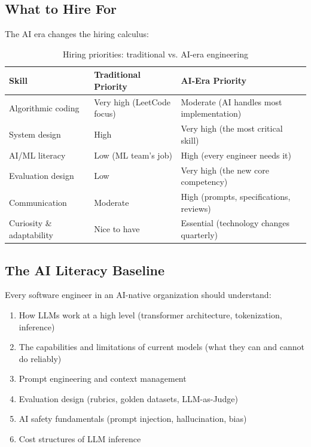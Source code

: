 \subsection{What to Hire For}

The AI era changes the hiring calculus:

\begin{table}[htbp]
\centering
\caption{Hiring priorities: traditional vs. AI-era engineering}
\label{tab:hiring}
\begin{tabularx}{\textwidth}{lXX}
\toprule
\textbf{Skill} & \textbf{Traditional Priority} & \textbf{AI-Era Priority} \\
\midrule
Algorithmic coding & Very high (LeetCode focus) & Moderate (AI handles most implementation) \\
System design & High & Very high (the most critical skill) \\
AI/ML literacy & Low (ML team's job) & High (every engineer needs it) \\
Evaluation design & Low & Very high (the new core competency) \\
Communication & Moderate & High (prompts, specifications, reviews) \\
Curiosity \& adaptability & Nice to have & Essential (technology changes quarterly) \\
\bottomrule
\end{tabularx}
\end{table}

\subsection{The AI Literacy Baseline}

Every software engineer in an AI-native organization should understand:

\begin{enumerate}[leftmargin=*]
    \item How LLMs work at a high level (transformer architecture, tokenization, inference)
    \item The capabilities and limitations of current models (what they can and cannot do reliably)
    \item Prompt engineering and context management
    \item Evaluation design (rubrics, golden datasets, LLM-as-Judge)
    \item AI safety fundamentals (prompt injection, hallucination, bias)
    \item Cost structures of LLM inference
\end{enumerate}

